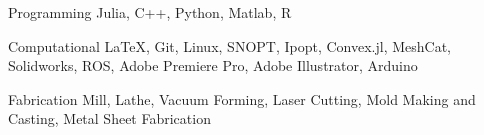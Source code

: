 

\begin{cvskills}

  \cvskill
    {Programming} %
    {Julia, C++, Python, Matlab, R} %

  \cvskill
    {Computational} %
    {\LaTeX, Git, Linux, SNOPT, Ipopt, Convex.jl, MeshCat, Solidworks, ROS, Adobe Premiere Pro, Adobe Illustrator, Arduino} %

  \cvskill
    {Fabrication} %
    {Mill, Lathe, Vacuum Forming, Laser Cutting, Mold Making and Casting, Metal Sheet Fabrication} %

\end{cvskills}
